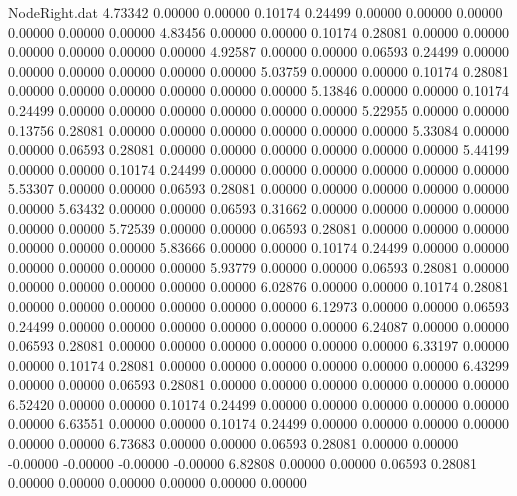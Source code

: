 \begin{filecontents}{NodeRight.dat}
   4.73342    0.00000    0.00000     0.10174    0.24499    0.00000    0.00000    0.00000    0.00000    0.00000    0.00000
   4.83456    0.00000    0.00000     0.10174    0.28081    0.00000    0.00000    0.00000    0.00000    0.00000    0.00000
   4.92587    0.00000    0.00000     0.06593    0.24499    0.00000    0.00000    0.00000    0.00000    0.00000    0.00000
   5.03759    0.00000    0.00000     0.10174    0.28081    0.00000    0.00000    0.00000    0.00000    0.00000    0.00000
   5.13846    0.00000    0.00000     0.10174    0.24499    0.00000    0.00000    0.00000    0.00000    0.00000    0.00000
   5.22955    0.00000    0.00000     0.13756    0.28081    0.00000    0.00000    0.00000    0.00000    0.00000    0.00000
   5.33084    0.00000    0.00000     0.06593    0.28081    0.00000    0.00000    0.00000    0.00000    0.00000    0.00000
   5.44199    0.00000    0.00000     0.10174    0.24499    0.00000    0.00000    0.00000    0.00000    0.00000    0.00000
   5.53307    0.00000    0.00000     0.06593    0.28081    0.00000    0.00000    0.00000    0.00000    0.00000    0.00000
   5.63432    0.00000    0.00000     0.06593    0.31662    0.00000    0.00000    0.00000    0.00000    0.00000    0.00000
   5.72539    0.00000    0.00000     0.06593    0.28081    0.00000    0.00000    0.00000    0.00000    0.00000    0.00000
   5.83666    0.00000    0.00000     0.10174    0.24499    0.00000    0.00000    0.00000    0.00000    0.00000    0.00000
   5.93779    0.00000    0.00000     0.06593    0.28081    0.00000    0.00000    0.00000    0.00000    0.00000    0.00000
   6.02876    0.00000    0.00000     0.10174    0.28081    0.00000    0.00000    0.00000    0.00000    0.00000    0.00000
   6.12973    0.00000    0.00000     0.06593    0.24499    0.00000    0.00000    0.00000    0.00000    0.00000    0.00000
   6.24087    0.00000    0.00000     0.06593    0.28081    0.00000    0.00000    0.00000    0.00000    0.00000    0.00000
   6.33197    0.00000    0.00000     0.10174    0.28081    0.00000    0.00000    0.00000    0.00000    0.00000    0.00000
   6.43299    0.00000    0.00000     0.06593    0.28081    0.00000    0.00000    0.00000    0.00000    0.00000    0.00000
   6.52420    0.00000    0.00000     0.10174    0.24499    0.00000    0.00000    0.00000    0.00000    0.00000    0.00000
   6.63551    0.00000    0.00000     0.10174    0.24499    0.00000    0.00000    0.00000    0.00000    0.00000    0.00000
   6.73683    0.00000    0.00000     0.06593    0.28081    0.00000    0.00000   -0.00000   -0.00000   -0.00000   -0.00000
   6.82808    0.00000    0.00000     0.06593    0.28081    0.00000    0.00000    0.00000    0.00000    0.00000    0.00000

\end{filecontents}
